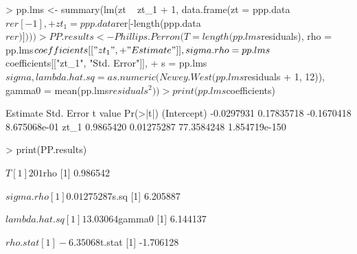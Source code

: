 \begin{Schunk}
\begin{Sinput}
> pp.lms <- summary(lm(zt ~ zt_1 + 1, data.frame(zt = ppp.data$rer[-1], 
+     zt_1 = ppp.data$rer[-length(ppp.data$rer)])))
> PP.results <- Phillips.Perron(T = length(pp.lms$residuals), rho = pp.lms$coefficients[["zt_1", 
+     "Estimate"]], sigma.rho = pp.lms$coefficients[["zt_1", "Std. Error"]], 
+     s = pp.lms$sigma, lambda.hat.sq = as.numeric(Newey.West(pp.lms$residuals %
+         1, 12)), gamma0 = mean(pp.lms$residuals^2))
> print(pp.lms$coefficients)
\end{Sinput}
\begin{Soutput}
              Estimate Std. Error    t value      Pr(>|t|)
(Intercept) -0.0297931 0.17835718 -0.1670418  8.675068e-01
zt_1         0.9865420 0.01275287 77.3584248 1.854719e-150
\end{Soutput}
\begin{Sinput}
> print(PP.results)
\end{Sinput}
\begin{Soutput}
$T
[1] 201

$rho
[1] 0.986542

$sigma.rho
[1] 0.01275287

$s.sq
[1] 6.205887

$lambda.hat.sq
[1] 13.03064

$gamma0
[1] 6.144137

$rho.stat
[1] -6.35068

$t.stat
[1] -1.706128
\end{Soutput}
\end{Schunk}

